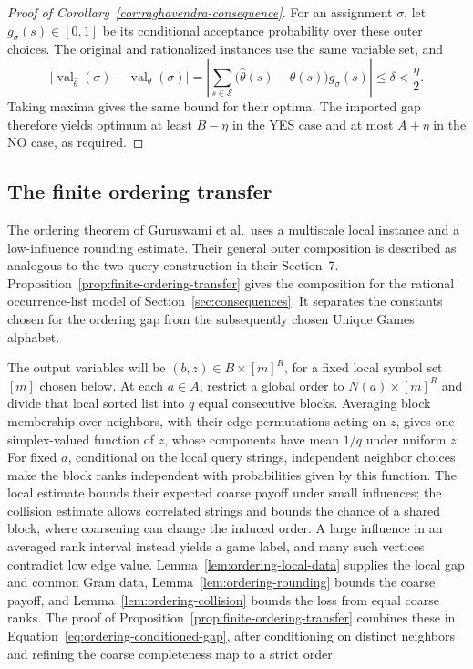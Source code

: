 \begin{proof}[Proof of Corollary~\ref{cor:raghavendra-consequence}]
For an assignment \(\sigma\), let \(g_\sigma(s)\in[0,1]\) be its
conditional acceptance probability over these outer choices. The
original and rationalized instances use the same variable set, and
\[
 \bigl|\operatorname{val}_{\widehat\theta}(\sigma)
       -\operatorname{val}_{\theta}(\sigma)\bigr|
 =\left|\sum_{s\in\mathcal S}
       \bigl(\widehat\theta(s)-\theta(s)\bigr)g_\sigma(s)\right|
 \le\delta<\frac{\eta}{2}.
\]
Taking maxima gives the same bound for their optima. The imported gap
therefore yields optimum at least \(B-\eta\) in the YES case and at most
\(A+\eta\) in the NO case, as required.
\end{proof}

\subsection{The finite ordering transfer}\label{subsec:ordering-transfer-proof}

The ordering theorem of Guruswami et al.\ uses a multiscale local
instance and a low-influence rounding estimate.  Their general
outer composition is described as analogous to the two-query
construction in their Section~7.  Proposition~\ref{prop:finite-ordering-transfer} gives
the composition for the rational occurrence-list model of
Section~\ref{sec:consequences}.  It separates the constants chosen
for the ordering gap from the subsequently chosen Unique Games
alphabet.

The output variables will be \((b,z)\in B\times[m]^R\), for a fixed
local symbol set \([m]\) chosen below. At each \(a\in A\), restrict a
global order to \(N(a)\times[m]^R\) and divide that local sorted list
into \(q\) equal consecutive blocks. Averaging block membership over
neighbors, with their edge permutations acting on \(z\), gives one
simplex-valued function of \(z\), whose components have mean \(1/q\)
under uniform \(z\). For fixed \(a\), conditional on the local query
strings, independent neighbor choices make the block ranks independent
with probabilities given by this function. The local estimate bounds
their expected coarse payoff under small influences; the collision
estimate allows correlated strings and bounds the chance of a shared
block, where coarsening can change the induced order. A large influence
in an averaged rank interval instead yields a game label, and many such
vertices contradict low edge value. Lemma~\ref{lem:ordering-local-data} supplies the local gap and common
Gram data, Lemma~\ref{lem:ordering-rounding} bounds the coarse payoff,
and Lemma~\ref{lem:ordering-collision} bounds the loss from equal coarse
ranks.  The proof of Proposition~\ref{prop:finite-ordering-transfer}
combines these in Equation~\eqref{eq:ordering-conditioned-gap}, after
conditioning on distinct neighbors and refining the coarse completeness
map to a strict order.

